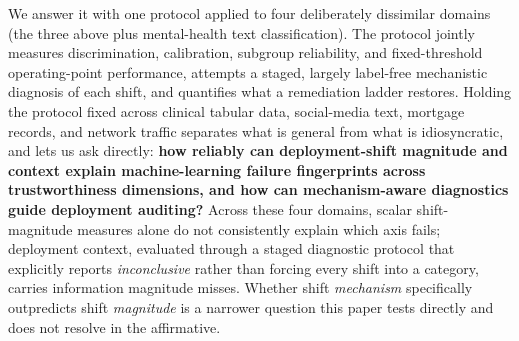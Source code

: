 \documentclass[11pt]{article}
\begin{document}
We answer it with one protocol applied to four deliberately dissimilar domains (the three above
plus mental-health text classification). The protocol jointly measures discrimination, calibration,
subgroup reliability, and fixed-threshold operating-point performance, attempts a staged, largely
label-free mechanistic diagnosis of each shift, and quantifies what a remediation ladder restores.
Holding the protocol fixed across clinical tabular data, social-media text, mortgage records, and
network traffic separates what is general from what is idiosyncratic, and lets us ask directly:
\textbf{how reliably can deployment-shift magnitude and context explain machine-learning failure
fingerprints across trustworthiness dimensions, and how can mechanism-aware diagnostics guide
deployment auditing?} Across these four domains, scalar shift-magnitude measures alone do not
consistently explain which axis fails; deployment context, evaluated through a staged diagnostic
protocol that explicitly reports \emph{inconclusive} rather than forcing every shift into a
category, carries information magnitude misses. Whether shift \emph{mechanism} specifically
outpredicts shift \emph{magnitude} is a narrower question this paper tests directly and does not
resolve in the affirmative.
\end{document}
